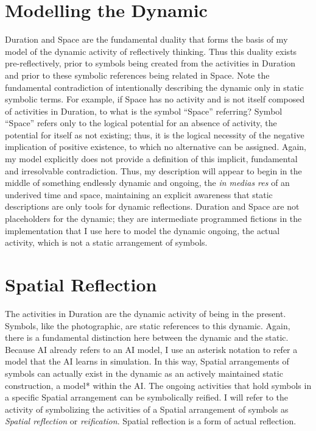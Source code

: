 \section{Modelling the Dynamic}
\label{section:modelling_the_dynamic}

Duration and Space are the fundamental duality that forms the basis of
my model of the dynamic activity of reflectively thinking.  Thus this
duality exists pre-reflectively, prior to symbols being created from
the activities in Duration and prior to these symbolic references
being related in Space.  Note the fundamental contradiction of
intentionally describing the dynamic only in static symbolic terms.
For example, if Space has no activity and is not itself composed of
activities in Duration, to what is the symbol ``Space'' referring?
Symbol ``Space'' refers only to the logical potential for an absence
of activity, the potential for itself as not existing; thus, it is the
logical necessity of the negative implication of positive existence,
to which no alternative can be assigned.  Again, my model explicitly
does not provide a definition of this implicit, fundamental and
irresolvable contradiction.  Thus, my description will appear to begin
in the middle of something endlessly dynamic and ongoing, the \emph{in
  medias res} of an underived time and space, maintaining an explicit
awareness that static descriptions are only tools for dynamic
reflections.  Duration and Space are not placeholders for the dynamic;
they are intermediate programmed fictions in the implementation that I
use here to model the dynamic ongoing, the actual activity, which is
not a static arrangement of symbols.

\section{Spatial Reflection}

The activities in Duration are the dynamic activity of being in the
present.  Symbols, like the photographic, are static references to
this dynamic.  Again, there is a fundamental distinction here between
the dynamic and the static.  Because AI already refers to an AI model,
I use an asterisk notation to refer a model that the AI learns in
simulation.  In this way, Spatial arrangements of symbols can actually
exist in the dynamic as an actively maintained static construction, a
model* within the AI.  The ongoing activities that hold symbols in a
specific Spatial arrangement can be symbolically reified.  I will
refer to the activity of symbolizing the activities of a Spatial
arrangement of symbols as \emph{Spatial reflection} or
\emph{reification}.  Spatial reflection is a form of actual
reflection.

